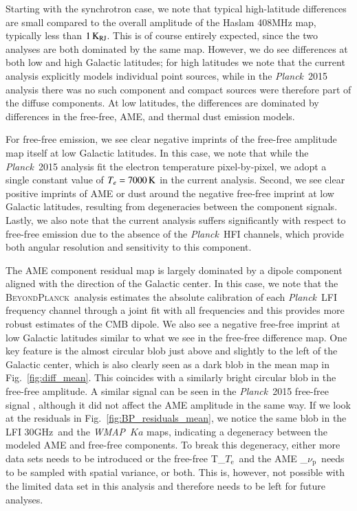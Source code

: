 \documentclass{aa}
\def\Planck{\textit{Planck}}
\def\,{\thinspace}
\def\GHz{\ifmmode \,\mathrm{GHz}\else \,GHz\fi}
\def\nup{\ifmmode \nu_{\mathrm{p}}\else $\nu_{\mathrm{p}}$\fi}
\def\Te{\ifmmode T_{\mathrm{e}}\else $T_{\mathrm{e}}$\fi}
\def\WMAP{\emph{WMAP}}
\newcommand{\BP}{\textsc{BeyondPlanck}}
\begin{document}
Starting with the synchrotron case, we note that typical high-latitude
differences are small compared to the overall amplitude of the Haslam
408\,MHz map, typically less than $1\,\mathrm{K}_{\mathrm{RJ}}$. This
is of course entirely expected, since the two analyses are both
dominated by the same map. However, we do see differences at both low
and high Galactic latitudes; for high latitudes we note that the
current analysis explicitly models individual point sources, while in
the \Planck\ 2015 analysis there was no such component and compact
sources were therefore part of the diffuse components. At low
latitudes, the differences are dominated by differences in the
free-free, AME, and thermal dust emission models.

For free-free emission, we see clear negative imprints of the free-free
amplitude map itself at low Galactic latitudes. In this case, we note
that while the \Planck\ 2015 analysis fit the electron temperature
pixel-by-pixel, we adopt a single constant value of $T_e =
7000\,\mathrm{K}$ in the current analysis. Second, we see clear positive
imprints of AME or dust around the negative free-free imprint at low
Galactic latitudes, resulting from degeneracies between the component
signals. Lastly, we also note that
the current analysis suffers significantly with respect to free-free
emission due to the absence of the \Planck\ HFI channels, which
provide both angular resolution and sensitivity to this component.

The AME component residual map is largely dominated by a dipole
component aligned with the direction of the Galactic center. In this
case, we note that the \BP\ analysis estimates the absolute
calibration of each \Planck\ LFI frequency channel through a joint fit
with all frequencies and this provides more robust estimates of the
CMB dipole. We also see a negative free-free imprint at low Galactic
latitudes similar to what we see in the free-free difference map.
One key feature is the almost circular blob just above and slightly to
the left of the Galactic center, which is also clearly seen as a dark
blob in the mean map in Fig.~\ref{fig:diff_mean}. This coincides with
a similarly bright circular blob in the free-free amplitude. A similar
signal can be seen in the \Planck\ 2015 free-free signal \citep{planck2014-a12},
although it did not affect the AME amplitude in the same way.
If we look at the residuals in Fig.~\ref{fig:BP_residuals_mean}, we
notice the same blob in the LFI 30\GHz\ and the \WMAP\ $Ka$ maps,
indicating a degeneracy between the modeled AME and free-free components.
To break this degeneracy, either more data sets needs to be introduced or
the free-free \Te\ and the AME \nup\ needs to be sampled with spatial
variance, or both. This is, however, not possible with the limited data set
in this analysis and therefore needs to be left for future analyses.
\end{document}
